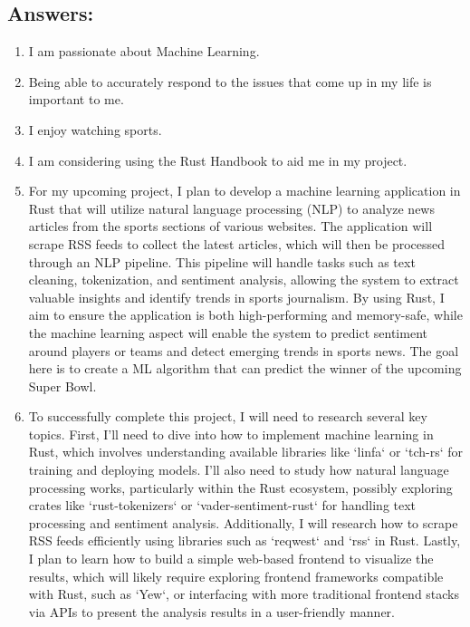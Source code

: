 \subsection{Answers:}
\begin{enumerate}
	\item I am passionate about Machine Learning.
	\item Being able to accurately respond to the issues that come up in my life is important to me.
	\item I enjoy watching sports.
	\item I am considering using the Rust Handbook to aid me in my project.
	\item For my upcoming project, I plan to develop a machine learning application in Rust that will utilize natural language processing (NLP) to analyze news articles from the sports sections of various websites. The application will scrape RSS feeds to collect the latest articles, which will then be processed through an NLP pipeline. This pipeline will handle tasks such as text cleaning, tokenization, and sentiment analysis, allowing the system to extract valuable insights and identify trends in sports journalism. By using Rust, I aim to ensure the application is both high-performing and memory-safe, while the machine learning aspect will enable the system to predict sentiment around players or teams and detect emerging trends in sports news. The goal here is to create a ML algorithm that can predict the winner of the upcoming Super Bowl.
	\item To successfully complete this project, I will need to research several key topics. First, I’ll need to dive into how to implement machine learning in Rust, which involves understanding available libraries like `linfa` or `tch-rs` for training and deploying models. I'll also need to study how natural language processing works, particularly within the Rust ecosystem, possibly exploring crates like `rust-tokenizers` or `vader-sentiment-rust` for handling text processing and sentiment analysis. Additionally, I will research how to scrape RSS feeds efficiently using libraries such as `reqwest` and `rss` in Rust. Lastly, I plan to learn how to build a simple web-based frontend to visualize the results, which will likely require exploring frontend frameworks compatible with Rust, such as `Yew`, or interfacing with more traditional frontend stacks via APIs to present the analysis results in a user-friendly manner.
\end{enumerate}


